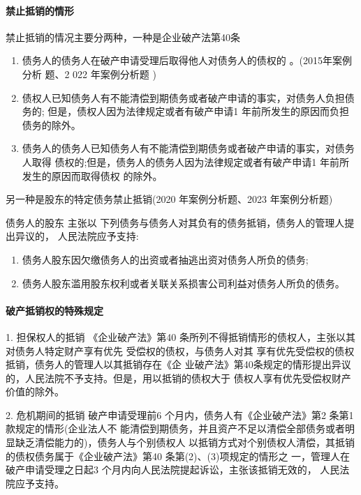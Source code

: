\documentclass[UTF8,12pt]{ctexart}
\numberwithin{equation}{section} %
\numberwithin{figure}{section}
\numberwithin{table}{section}
\begin{document}
	\paragraph{禁止抵销的情形}
	禁止抵销的情况主要分两种，一种是企业破产法第40条
	\begin{enumerate}
		\item 债务人的债务人在破产申请受理后取得他人对债务人的债权的 。(2015年案例分析 题、2 022 年案例分析题 )
		
		\item 债权人已知债务人有不能清偿到期债务或者破产申请的事实，对债务人负担债务的; 但是，债权人因为法律规定或者有破产申请1 年前所发生的原因而负担债务的除外。
		
		\item 债务人的债务人已知债务人有不能清偿到期债务或者破产申请的事实，对债务人取得 债权的;但是，债务人的债务人因为法律规定或者有破产申请1 年前所发生的原因而取得债权 的除外。
	\end{enumerate}
	
	另一种是股东的特定债务禁止抵销(2020 年案例分析题、2023 年案例分析题)
	
	债务人的股东 主张以 下列债务与债务人对其负有的债务抵销，债务人的管理人提出异议的， 人民法院应予支持:
	\begin{enumerate}
		\item 债务人股东因欠缴债务人的出资或者抽逃出资对债务人所负的债务;
		
		\item 债务人股东滥用股东权利或者关联关系损害公司利益对债务人所负的债务。
	\end{enumerate}
	
	\paragraph{破产抵销权的特殊规定}
	1. 担保权人的抵销
	《企业破产法》第40 条所列不得抵销情形的债权人，主张以其对债务人特定财产享有优先 受偿权的债权，与债务人对其 享有优先受偿权的债权抵销，债务人的管理人以其抵销存在《企 业破产法》第40条规定的情形提出异议的，人民法院不予支持。但是，用以抵销的债权大于 债权人享有优先受偿权财产价值的除外。
	
	2. 危机期间的抵销
	破产申请受理前6 个月内，债务人有《企业破产法》第2 条第1款规定的情形(企业法人不 能清偿到期债务，并且资产不足以清偿全部债务或者明显缺乏清偿能力的)，债务人与个别债权人 以抵销方式对个别债权人清偿，其抵销的债权债务属于《企业破产法》第40 条第(2)、(3)项规定的情形之 一，管理人在破产申请受理之日起3 个月内向人民法院提起诉讼，主张该抵销无效的， 人民法院应予支持。
	
\end{document}

